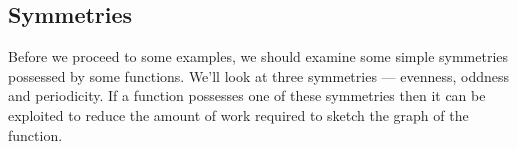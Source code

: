 %
%
%
%
%


\subsection{Symmetries}
Before we proceed to some examples, we should examine some simple symmetries possessed by
some functions. We'll look at three symmetries --- evenness, oddness and periodicity.
If a function possesses one of these symmetries then it can be exploited to reduce the
amount of work required to sketch the graph of the function.

